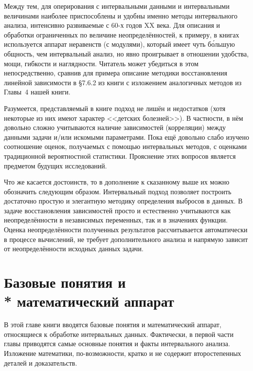 \documentclass[a5paper,openany]{book}
\begin{document}
Между тем, для оперирования с интервальными данными и интервальными величинами 
наиболее приспособлены и удобны именно методы интервального анализа, интенсивно 
развиваемые с 60-х годов XX века. Для описания и обработки ограниченных по величине 
неопределённостей, к примеру, в книгах \cite{Eliasberg76,Eliasberg83} используется 
аппарат неравенств (с модулями), который имеет чуть б\'{о}льшую общность, чем 
интервальный анализ, но явно проигрывает в отношении удобства, мощи, гибкости и 
наглядности. Читатель может убедиться в этом непосредственно, сравнив для примера 
описание методики восстановления линейной зависимости в \S 7.6.2 из книги 
\cite{Eliasberg76} с изложением аналогичных методов из Главы~4 нашей книги. 
  
Разумеется, представляемый в книге подход не лишён и недостатков (хотя некоторые 
из них имеют характер <<детских болезней>>). В частности, в нём довольно сложно 
учитываются наличие зависимостей (корреляции) между данными задачи и/или искомыми 
параметрами. Пока ещё довольно слабо изучено соотношение оценок, получаемых с помощью 
интервальных методов, с оценками традиционной вероятностной статистики. Прояснение 
этих вопросов является предметом будущих исследований. 
  
Что же касается достоинств, то в дополнение к сказанному выше их можно обозначить 
следующим образом. Интервальный подход позволяет построить достаточно простую и 
элегантную методику определения выбросов в данных. В задаче восстановления зависимостей 
просто и естественно учитываются как неопределённости в независимых переменных, так и 
в значениях функции. Оценка неопределённости полученных результатов рассчитывается 
автоматически в процессе вычислений, не требует дополнительного анализа и напрямую 
зависит от неопределённости исходных данных задачи. 
  
  
  
\chapter[Базовые понятия и математический аппарат]%
        {Базовые понятия и \\* математический аппарат} 
\label{PrimaryConceptChap} 
  
  
В этой главе книги вводятся базовые понятия и математический аппарат, относящиеся 
к обработке интервальных данных. Фактически, в первой части главы приводятся самые 
основные понятия и факты интервального анализа. Изложение математики, по-возможности, 
кратко и не содержит второстепенных деталей и доказательств. 
  
\end{document}
